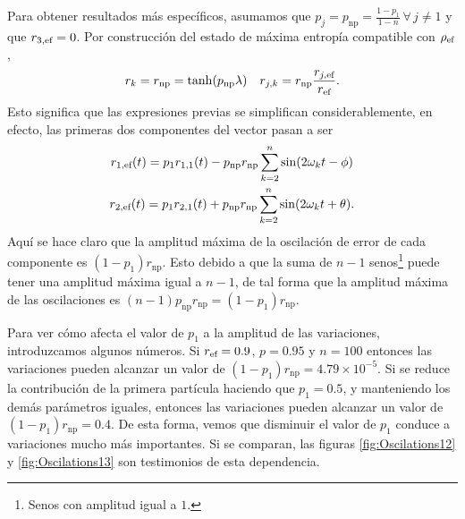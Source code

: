 Para obtener resultados más específicos, asumamos que $p_{j}=p_{\text{np}}=\frac{1-p_{1}}{1-n}\,\forall\,j\neq 1$ y que $r_{3,\text{ef}}=0$. Por construcción del estado de máxima entropía compatible con $\rho_{\text{ef}}$,
\begin{align}
    r_{k}=r_{\text{np}}=\tanh(p_{\text{np}} \lambda) & & r_{j,k}=r_{\text{np}}\frac{r_{j,\text{ef}}}{r_{\text{ef}}}.\nonumber
\end{align}
Esto significa que las expresiones previas se simplifican considerablemente, en efecto, las primeras dos componentes del vector pasan a ser
\begin{equation}\label{eq:}
    \begin{gathered}
        r_{1,\text{ef}}(t)=p_{1}r_{1,1}(t)-p_{\text{np}}r_{\text{np}}\sum_{k=2}^{n}\sin(2\omega_{k} t-\phi)\\
        r_{2,\text{ef}}(t)=p_{1}r_{2,1}(t)+p_{\text{np}}r_{\text{np}}\sum_{k=2}^{n}\sin(2\omega_{k} t+\theta).
    \end{gathered}
\end{equation}
Aquí se hace claro que la amplitud máxima de la oscilación de error de cada componente es $(1-p_{1})r_{\text{np}}$. Esto debido a que la suma de $n-1$ senos\footnote{Senos con amplitud igual a $1$.} puede tener una amplitud máxima igual a $n-1$, de tal forma que la amplitud máxima de las oscilaciones es $(n-1)p_{\text{np}}r_{\text{np}}=(1-p_{1})r_{\text{np}}$.


Para ver cómo afecta el valor de $p_{1}$ a la amplitud de las variaciones, introduzcamos algunos números. Si $r_{\text{ef}}=0.9$, $p=0.95$ y $n=100$ entonces las variaciones pueden alcanzar un valor de $(1-p_{1})r_{\text{np}}=4.79\times 10^{-5}$. Si se reduce la contribución de la primera partícula haciendo que $p_{1}=0.5$, y manteniendo los demás parámetros iguales, entonces las variaciones pueden alcanzar un valor de $(1-p_{1})r_{\text{np}}=0.4$. De esta forma, vemos que disminuir el valor de $p_{1}$ conduce a variaciones mucho más importantes. Si se comparan, las figuras \ref{fig:Oscilations12} y \ref{fig:Oscilations13} son testimonios de esta dependencia. 

